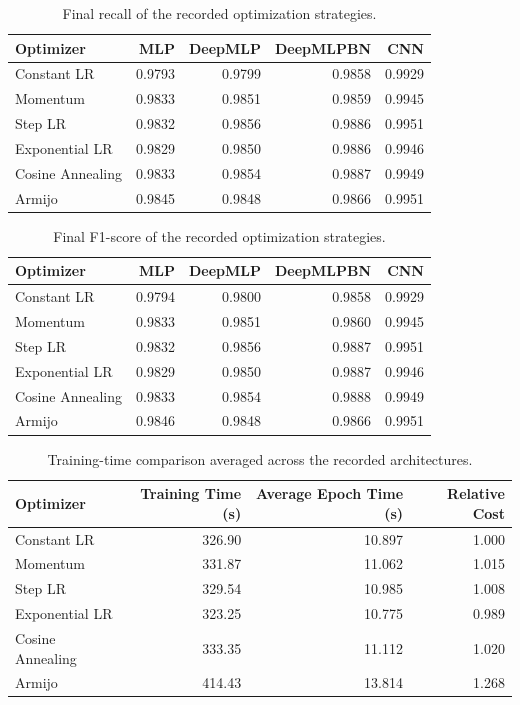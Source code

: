 \begin{table}[ht]
\centering
\caption{Final recall of the recorded optimization strategies.}
\label{tab:recall_results}
\begin{tabular}{lrrrr}
\hline
Optimizer & MLP & DeepMLP & DeepMLPBN & CNN \\
\hline
Constant LR & 0.9793 & 0.9799 & 0.9858 & 0.9929 \\
Momentum & 0.9833 & 0.9851 & 0.9859 & 0.9945 \\
Step LR & 0.9832 & 0.9856 & 0.9886 & 0.9951 \\
Exponential LR & 0.9829 & 0.9850 & 0.9886 & 0.9946 \\
Cosine Annealing & 0.9833 & 0.9854 & 0.9887 & 0.9949 \\
Armijo & 0.9845 & 0.9848 & 0.9866 & 0.9951 \\
\hline
\end{tabular}
\end{table}

\begin{table}[ht]
\centering
\caption{Final F1-score of the recorded optimization strategies.}
\label{tab:f1_results}
\begin{tabular}{lrrrr}
\hline
Optimizer & MLP & DeepMLP & DeepMLPBN & CNN \\
\hline
Constant LR & 0.9794 & 0.9800 & 0.9858 & 0.9929 \\
Momentum & 0.9833 & 0.9851 & 0.9860 & 0.9945 \\
Step LR & 0.9832 & 0.9856 & 0.9887 & 0.9951 \\
Exponential LR & 0.9829 & 0.9850 & 0.9887 & 0.9946 \\
Cosine Annealing & 0.9833 & 0.9854 & 0.9888 & 0.9949 \\
Armijo & 0.9846 & 0.9848 & 0.9866 & 0.9951 \\
\hline
\end{tabular}
\end{table}

\begin{table}[ht]
\centering
\caption{Training-time comparison averaged across the recorded architectures.}
\label{tab:training_time}
\begin{tabular}{lrrr}
\hline
Optimizer & Training Time (s) & Average Epoch Time (s) & Relative Cost \\
\hline
Constant LR & 326.90 & 10.897 & 1.000 \\
Momentum & 331.87 & 11.062 & 1.015 \\
Step LR & 329.54 & 10.985 & 1.008 \\
Exponential LR & 323.25 & 10.775 & 0.989 \\
Cosine Annealing & 333.35 & 11.112 & 1.020 \\
Armijo & 414.43 & 13.814 & 1.268 \\
\hline
\end{tabular}
\end{table}

